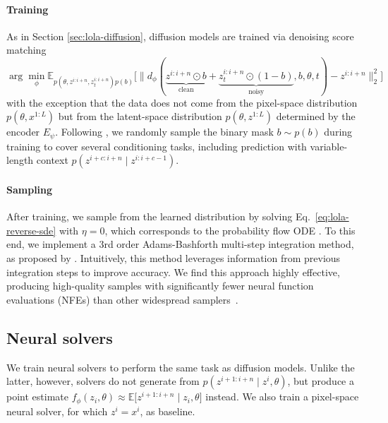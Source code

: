 \paragraph{Training} As in Section \ref{sec:lola-diffusion}, diffusion models are trained via denoising score matching \cite{vincent2011connection, hyvarinen2005estimation}
\begin{equation}
    \arg\min_\phi \mathbb{E}_{p(\theta, z^{i:i+n}, z_t^{i:i+n}) p(b)} \Big[ \big\| d_\phi(\underbrace{z^{i:i+n} \odot b}_\text{clean} + \underbrace{z_t^{i:i+n} \odot (1 - b)}_\text{noisy}, b, \theta, t) - z^{i:i+n} \big\|_2^2 \Big]
\end{equation}
with the exception that the data does not come from the pixel-space distribution $p(\theta, x^{1:L})$ but from the latent-space distribution $p(\theta, z^{1:L})$ determined by the encoder $E_\psi$. Following \textcite{voleti2022mcvd}, we randomly sample the binary mask $b \sim p(b)$ during training to cover several conditioning tasks, including prediction with variable-length context $p(z^{i+c:i+n} \mid z^{i:i+c-1})$.

\paragraph{Sampling} After training, we sample from the learned distribution by solving Eq.~\eqref{eq:lola-reverse-sde} with $\eta = 0$, which corresponds to the probability flow ODE \cite{song2021scorebased}. To this end, we implement a 3rd order Adams-Bashforth multi-step integration method, as proposed by \textcite{zhang2023fast}. Intuitively, this method leverages information from previous integration steps to improve accuracy. We find this approach highly effective, producing high-quality samples with significantly fewer neural function evaluations (NFEs) than other widespread samplers~\cite{song2021denoising, karras2022elucidating}.

\subsection{Neural solvers}

We train neural solvers to perform the same task as diffusion models. Unlike the latter, however, solvers do not generate from $p(z^{i+1:i+n} \mid z^i, \theta)$, but produce a point estimate $f_\phi(z_i, \theta) \approx \mathbb{E}\big[ z^{i+1:i+n} \mid z_i, \theta \big]$ instead. We also train a pixel-space neural solver, for which $z^i = x^i$, as baseline.

